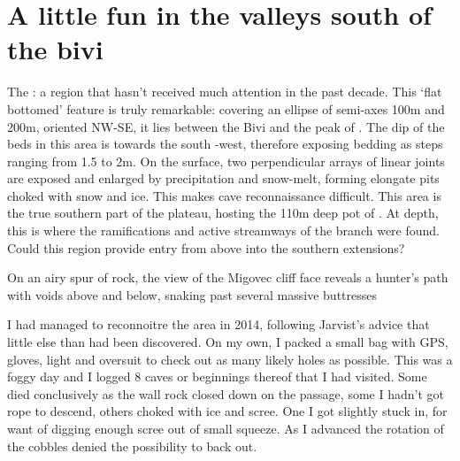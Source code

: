 \section{A little fun in the valleys south of the bivi}


The : a region that hasn't received much attention in the past decade. This `flat bottomed' feature is truly remarkable: covering an ellipse of semi-axes 100m and 200m, oriented NW-SE, it lies between the Bivi and the peak of . The dip of the beds in this area is towards the south -west, therefore exposing bedding as steps ranging from 1.5 to 2m. On the surface, two perpendicular arrays of linear joints are exposed and enlarged by precipitation and snow-melt, forming elongate pits choked with snow and ice. This makes cave reconnaissance difficult. This area is the true southern part of the plateau, hosting the 110m deep pot of .  At depth, this is where the ramifications and active streamways of the  branch were found. Could this region provide entry from above into the southern extensions?

\begin{marginfigure}
\centering
{}
\label{migface}
\caption{On an airy spur of rock, the view of the Migovec cliff face reveals a hunter's path with voids above and below, snaking past several massive buttresses }
\end{marginfigure}

I had managed to reconnoitre the area in 2014, following Jarvist's advice that little else than  had been discovered. On my own, I packed a small bag with GPS, gloves, light and oversuit to check out as many likely holes as possible. This was a foggy day and I logged 8 caves or beginnings thereof that I had visited. Some died conclusively as the wall rock closed down on the passage, some I hadn't got rope to descend, others choked with ice and scree. One I got slightly stuck in, for want of digging enough scree out of small squeeze. As I advanced the rotation of the cobbles denied the possibility to back out. 

